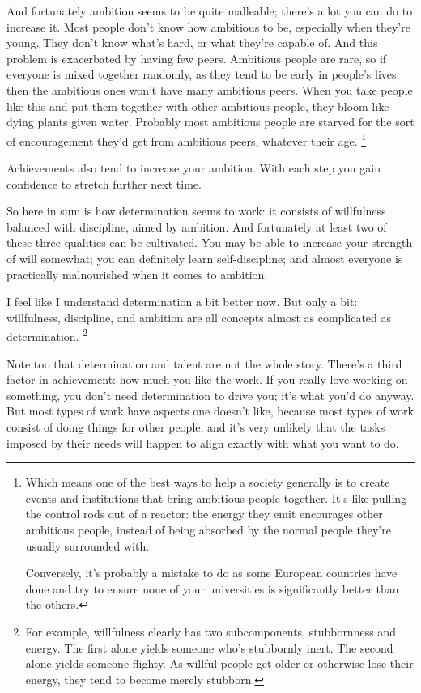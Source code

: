 \documentclass[12pt]{book}
\begin{document}
And fortunately ambition seems to be quite malleable; there's a lot you
can do to increase it. Most people don't know how ambitious to be,
especially when they're young. They don't know what's hard, or what
they're capable of. And this problem is exacerbated by having few peers.
Ambitious people are rare, so if everyone is mixed together randomly, as
they tend to be early in people's lives, then the ambitious ones won't
have many ambitious peers. When you take people like this and put them
together with other ambitious people, they bloom like dying plants given
water. Probably most ambitious people are starved for the sort of
encouragement they'd get from ambitious peers, whatever their age.
\footnote{Which means one of the best ways to help a society generally is
to create \href{http://startupschool.org}{events} and
\href{http://ycombinator.com}{institutions} that bring ambitious people
together. It's like pulling the control rods out of a reactor: the
energy they emit encourages other ambitious people, instead of being
absorbed by the normal people they're usually surrounded with.

Conversely, it's probably a mistake to do as some European countries
have done and try to ensure none of your universities is significantly
better than the others.}

Achievements also tend to increase your ambition. With each step you
gain confidence to stretch further next time.

So here in sum is how determination seems to work: it consists of
willfulness balanced with discipline, aimed by ambition. And fortunately
at least two of these three qualities can be cultivated. You may be able
to increase your strength of will somewhat; you can definitely learn
self-discipline; and almost everyone is practically malnourished when it
comes to ambition.

I feel like I understand determination a bit better now. But only a bit:
willfulness, discipline, and ambition are all concepts almost as
complicated as determination. \footnote{For example, willfulness clearly has two subcomponents,
stubbornness and energy. The first alone yields someone who's stubbornly
inert. The second alone yields someone flighty. As willful people get
older or otherwise lose their energy, they tend to become merely
stubborn.}

Note too that determination and talent are not the whole story. There's
a third factor in achievement: how much you like the work. If you really
\href{love.html}{love} working on something, you don't need
determination to drive you; it's what you'd do anyway. But most types of
work have aspects one doesn't like, because most types of work consist
of doing things for other people, and it's very unlikely that the tasks
imposed by their needs will happen to align exactly with what you want
to do.
\end{document}

